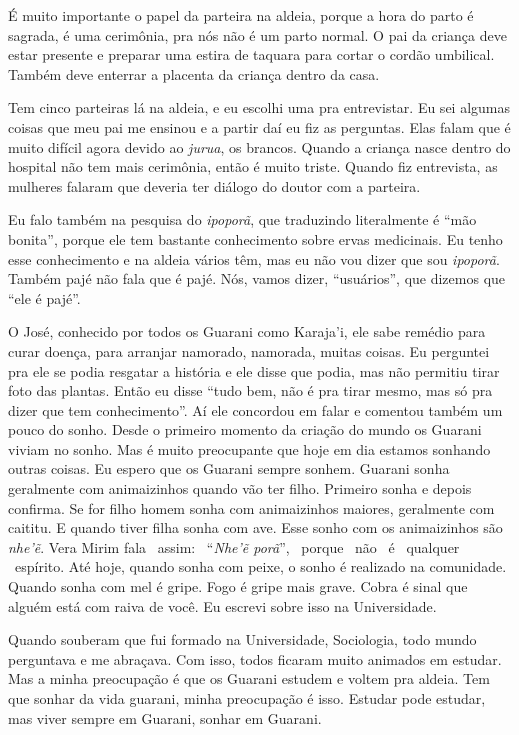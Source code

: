É muito importante o papel da parteira na aldeia, porque a hora do parto
é sagrada, é uma cerimônia, pra nós não é um parto normal. O pai da
criança deve estar presente e preparar uma estira de taquara para
cortar o cordão umbilical. Também deve enterrar a placenta da criança
dentro da casa.

Tem cinco parteiras lá na aldeia, e eu escolhi uma pra entrevistar. Eu
sei algumas coisas que meu pai me ensinou e a partir daí eu fiz as
perguntas. Elas falam que é muito difícil agora devido ao \emph{jurua}, os
brancos. Quando a criança nasce dentro do hospital não tem mais
cerimônia, então é muito triste. Quando fiz entrevista, as mulheres
falaram que deveria ter diálogo do doutor com a parteira. 

Eu falo também na pesquisa do \emph{ipoporã}, que traduzindo literalmente é
``mão bonita'', porque ele tem bastante conhecimento sobre ervas
medicinais. Eu tenho esse conhecimento e na aldeia vários têm, mas eu
não vou dizer que sou \emph{ipoporã}. Também pajé não fala que é pajé. Nós,
vamos dizer, ``usuários'', que dizemos que ``ele é pajé''.

O José, conhecido por todos os Guarani como Karaja’i, ele sabe remédio
para curar doença, para arranjar namorado, namorada, muitas coisas. Eu
perguntei pra ele se podia resgatar a história e ele disse que podia,
mas não permitiu tirar foto das plantas. Então eu disse ``tudo bem, não
é pra tirar mesmo, mas só pra dizer que tem conhecimento''. Aí ele
concordou em falar e comentou também um pouco do sonho. Desde o
primeiro momento da criação do mundo os Guarani viviam no sonho. Mas é
muito preocupante que hoje em dia estamos sonhando outras coisas. Eu
espero que os Guarani sempre sonhem. Guarani sonha geralmente com
animaizinhos quando vão ter filho. Primeiro sonha e depois confirma. Se
for filho homem sonha com animaizinhos maiores, geralmente com caititu.
E quando tiver filha sonha com ave. Esse sonho com os animaizinhos são
\emph{nhe’ẽ}. Vera Mirim fala ~assim: ~``\emph{Nhe’ẽ porã}'', ~porque ~não ~é
~qualquer ~espírito. Até hoje, quando sonha com peixe, o sonho é
realizado na comunidade. Quando sonha com mel é gripe. Fogo é gripe
mais grave. Cobra é sinal que alguém está com raiva de você. Eu escrevi
sobre isso na Universidade.

Quando souberam que fui formado na Universidade, Sociologia, todo mundo
perguntava e me abraçava. Com isso, todos ficaram muito animados em
estudar. Mas a minha preocupação é que os Guarani estudem e voltem pra
aldeia. Tem que sonhar da vida guarani, minha preocupação é isso.
Estudar pode estudar, mas viver sempre em Guarani, sonhar em Guarani.

